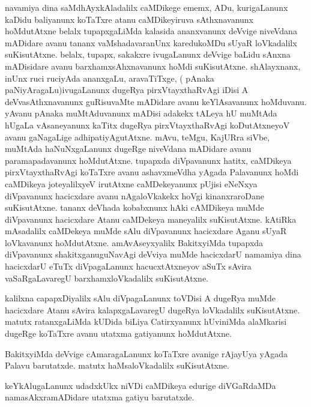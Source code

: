 \documentclass{article}
\begin{document}
\begin{mng}%
navamiya dina saMdhAyxkAladalilx caMDikege ememx, ADu, kurigaLanunx kaDidu baliyanunx koTaTxre 
atanu caMDikeyiruva sAthxnavanunx hoMdutAtxne belalx tupapxgaLiMda kalasida ananxvanunx deVvige 
niveVdana mADidare avanu tananx vaMshadavaranUnx karedukoMDu sUyaR loVkadalilx suKisutAtxne. 
belalx, tupapx, sakakxre ivugaLanunx deVvige baLidu sAnxna mADisidare avanu barxhamxsAhxnavanunx 
hoMdi suKisutAtxne. shAlayxnanx, inUnx ruci ruciyAda ananxgaLu, aravaTiTxge, ( pAnaka 
paNiyAragaLu)ivugaLanunx dugeRya pirxVtayxthaRvAgi iDisi A deVvasAthxnavanunx guRisuvaMte 
mADidare avanu keYlAsavanunx hoMduvanu. yAvanu pAnaka muMtAduvanunx mADisi adakekx tALeya hU 
muMtAda hUgaLa vAsaneyanunx kaTitx dugeRya pirxVtayxthaRvAgi koDutAtxneyoV avanu gaNagaLige 
adhipatiyAgutAtxne. mAvu, teMgu, KajURra siVbe, muMtAda haNuNxgaLanunx dugeRge niveVdana mADidare 
avanu paramapadavanunx hoMdutAtxne. tupapxda diVpavanunx hatitx, caMDikeya pirxVtayxthaRvAgi 
koTaTxre avanu ashavxmeVdha yAgada Palavanunx hoMdi caMDikeya joteyalilxyeV irutAtxne 
caMDekeyanunx pUjisi eNeNxya diVpavanunx hacicxdare avanu nAgaloVkakekx hoVgi kinanxraroDane 
suKisutAtxne. tananx deVhada kobabxnunx hAki cAMDikeya muMde diVpavanunx hacicxdare Atanu 
caMDekeya maneyalilx suKisutAtxne. kAtiRka mAsadalilx caMDekeya muMde sAlu diVpavanunx hacicxdare 
Aganu sUyaR loVkavanunx hoMdutAtxne. amAvAseyxyalilx BakitxyiMda tupapxda diVpavanunx 
shakitxganuguNavAgi deVviya muMde hacicxdarU namamiya dina hacicxdarU eTuTx diVpagaLanunx 
hacucxtAtxneyov aSuTx sAvira vaSaRgaLavaregU barxhamxloVkadalilx suKisutAtxne.
\end{mng}

\begin{mng}%
kalilxna capapxDiyalilx sAlu diVpagaLanunx toVDisi A dugeRya muMde hacicxdare Atanu sAvira 
kalapxgaLavaregU dugeRya loVkadalilx suKisutAtxne. matutx ratanxgaLiMda kUDida biLiya 
Catirxyanunx hUviniMda alaMkarisi dugeRge koTaTxre avanu utatxma gatiyanunx hoMdutAtxne.
\end{mng}

\begin{mng}%
BakitxyiMda deVvige cAmaragaLanunx koTaTxre avanige rAjayUya yAgada Palavu barutatxde. matutx 
haMsaloVkadalilx suKisutAtxne.
\end{mng}

\begin{mng}%
keYkAlugaLanunx udadxkUkx niVDi caMDikeya edurige diVGaRdaMDa namasAkxramADidare utatxma gatiyu 
barutatxde.
\end{mng}
\end{document}
